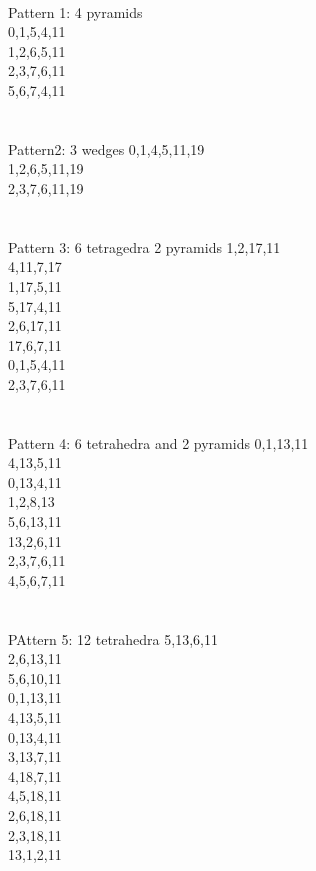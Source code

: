 \documentclass[twocolumn]{article}
\begin{document}
 \\
        \tiny Pattern 1: 4 pyramids \\
\tiny 0,1,5,4,11 \\
\tiny 1,2,6,5,11 \\
\tiny 2,3,7,6,11 \\
\tiny 5,6,7,4,11 \\
\tiny   \\

  
  \\ 
\tiny Pattern2: 3 wedges
\tiny 0,1,4,5,11,19 \\
\tiny 1,2,6,5,11,19 \\
\tiny 2,3,7,6,11,19 \\
\tiny   \\

 \\ 
\tiny Pattern 3: 6 tetragedra 2 pyramids
\tiny 1,2,17,11 \\
\tiny 4,11,7,17 \\
\tiny 1,17,5,11 \\
\tiny 5,17,4,11 \\
\tiny 2,6,17,11 \\
\tiny 17,6,7,11 \\
\tiny 0,1,5,4,11 \\
\tiny 2,3,7,6,11 \\
\tiny   \\

 \\
        \tiny Pattern 4: 6 tetrahedra and 2 pyramids
\tiny 0,1,13,11 \\
\tiny 4,13,5,11 \\
\tiny 0,13,4,11 \\
\tiny 1,2,8,13 \\
\tiny 5,6,13,11 \\
\tiny 13,2,6,11 \\
\tiny 2,3,7,6,11 \\
\tiny 4,5,6,7,11 \\
\tiny   \\

 \\
        \tiny PAttern 5: 12 tetrahedra
\tiny 5,13,6,11 \\
\tiny 2,6,13,11 \\
\tiny 5,6,10,11 \\
\tiny 0,1,13,11 \\
\tiny 4,13,5,11 \\
\tiny 0,13,4,11 \\
\tiny 3,13,7,11 \\
\tiny 4,18,7,11 \\
\tiny 4,5,18,11 \\
\tiny 2,6,18,11 \\
\tiny 2,3,18,11 \\
\tiny 13,1,2,11 \\
\end{document}
